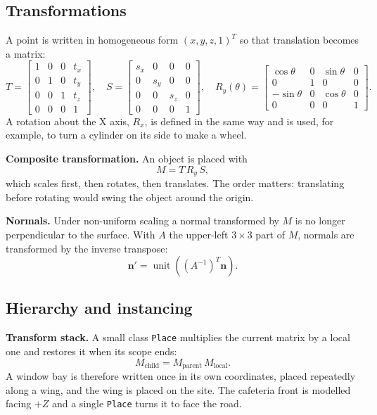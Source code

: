 \documentclass[11pt,a4paper]{article}
\newcommand{\vect}[1]{\mathbf{#1}}
\newcommand{\code}[1]{\texttt{#1}}
\newcommand{\unit}[1]{\operatorname{unit}\!\left(#1\right)}
\begin{document}
\subsection{Transformations}\label{sec:transform}
A point is written in homogeneous form $(x,y,z,1)^T$ so that translation
becomes a matrix:
\begin{equation}
T=\begin{bmatrix}1&0&0&t_x\\0&1&0&t_y\\0&0&1&t_z\\0&0&0&1\end{bmatrix},\quad
S=\begin{bmatrix}s_x&0&0&0\\0&s_y&0&0\\0&0&s_z&0\\0&0&0&1\end{bmatrix},\quad
R_y(\theta)=\begin{bmatrix}\cos\theta&0&\sin\theta&0\\0&1&0&0\\-\sin\theta&0&\cos\theta&0\\0&0&0&1\end{bmatrix}.
\end{equation}
A rotation about the X axis, $R_x$, is defined in the same way and is used,
for example, to turn a cylinder on its side to make a wheel.

\textbf{Composite transformation.} An object is placed with
\begin{equation}
M = T\,R_y\,S ,
\end{equation}
which scales first, then rotates, then translates. The order matters:
translating before rotating would swing the object around the origin.

\textbf{Normals.} Under non-uniform scaling a normal transformed by $M$ is no
longer perpendicular to the surface. With $A$ the upper-left $3\times3$ part
of $M$, normals are transformed by the inverse transpose:
\begin{equation}
\vect n'=\unit{(A^{-1})^{T}\vect n}.
\end{equation}

\subsection{Hierarchy and instancing}\label{sec:hier}
\textbf{Transform stack.} A small class \code{Place} multiplies the current
matrix by a local one and restores it when its scope ends:
\begin{equation}
M_{\mathrm{child}}=M_{\mathrm{parent}}\,M_{\mathrm{local}}.
\end{equation}
A window bay is therefore written once in its own coordinates, placed
repeatedly along a wing, and the wing is placed on the site. The cafeteria
front is modelled facing $+Z$ and a single \code{Place} turns it to face the road.
\end{document}
